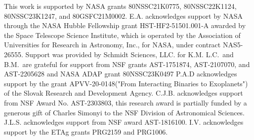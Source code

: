 \documentclass[twocolumn]{aastex631}
\begin{document}
\begin{acknowledgments}
\begin{small}
This work is supported by NASA grants 
80NSSC21K0775, 
80NSSC22K1124,
80NSSC23K1247, 
and 
80GSFC21M0002.
E.A. acknowledges support by NASA through the NASA Hubble Fellowship grant HST-HF2-51501.001-A awarded by the Space Telescope Science Institute, 
which is operated by the Association of Universities for Research in Astronomy, Inc., for NASA, under contract NAS5-26555. 
Support was provided by Schmidt Sciences, LLC. for K.M.
L.C.\ and B.M.\ are grateful for support from NSF grants AST-1751874, AST-2107070, and AST-2205628 and NASA ADAP grant 80NSSC23K0497
P.A.D acknowledges support by the grant APVV-20-0148("From Interacting Binaries
to Exoplanets") of the Slovak Research and Development Agency.
C.J.B. acknowledges support from NSF Award No. AST-2303803, this research award is partially funded by a generous gift of Charles Simonyi to the NSF Division of Astronomical Sciences.
J.L.S. acknowledges support from NSF award AST-1816100.
I.V. acknowledges support by the ETAg grants PRG2159 and PRG1006.

\end{small}
\end{acknowledgments}

%
\end{document}

